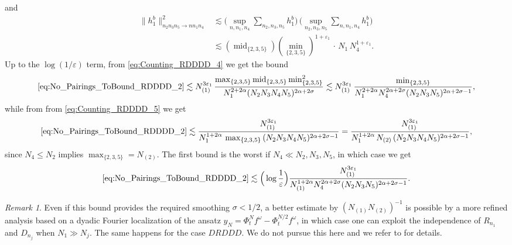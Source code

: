 \documentclass[11pt, xcolor = dvipsnames,reqno
]{amsart}
\theoremstyle{definition}
\theoremstyle{remark}
\newtheorem{rmk}[thm]{Remark}
\begin{document}
and 
\begin{align}\label{eq:Counting_RDDDD_5}
    \lVert  h^b_1 \rVert_{n_2n_3n_5 \to nn_1n_4}^2 
    &  \lesssim \Big(\sup_{n, n_1, n_4} \sum_{n_2, n_3, n_5} h^b_1  \Big)
    \, \Big( \sup_{n_2, n_3, n_5} \sum_{n, n_1, n_4} h^b _1\Big) \nonumber \\
    &\lesssim (\operatorname{mid}_{\{2,3,5\}})(\operatorname{min}_{\{2,3,5\}})^{1+{\varepsilon_1}}  \, \cdot \, N_1 \, N_4^{1+\varepsilon_1}.
\end{align}
Up to the $\log (1/\varepsilon)$ term, from \eqref{eq:Counting_RDDDD_4} we get the bound
\begin{align}
    \eqref{eq:No_Pairings_ToBound_RDDDD_2}
    \lesssim 
    N_{(1)}^{3\varepsilon_1} \,
    \frac{\operatorname{max}_{\{2,3,5\}} \operatorname{mid}_{\{2,3,5\}} \operatorname{min}_{\{2,3,5\}}^2 }{N_1^{2+2\alpha}(N_2N_3N_4N_5)^{2\alpha + 2\sigma}} 
    \lesssim 
    N_{(1)}^{3\varepsilon_1} \,
    \frac{\operatorname{min}_{\{2,3,5\}} 
    }{N_1^{2+2\alpha}N_4^{2\alpha + 2\sigma}(N_2N_3N_5)^{2 \alpha + 2\sigma - 1}}, 
\end{align}
while from from \eqref{eq:Counting_RDDDD_5} we get
\begin{align}
    \eqref{eq:No_Pairings_ToBound_RDDDD_2}
    \lesssim 
    \frac{N_{(1)}^{3\varepsilon_1}}{N_1^{1+2\alpha}  \, \operatorname{max}_{\{2,3,5\}} \, (N_2 N_3 N_4 N_5)^{2 \alpha + 2\sigma - 1} }
    = 
    \frac{N_{(1)}^{3\varepsilon_1}}{N_1^{1+2\alpha}  \, N_{(2)} \, (N_2 N_3 N_4 N_5)^{2 \alpha + 2\sigma - 1} },
\end{align}
since $N_4 \leq N_2$ implies $\operatorname{max}_{\{2,3,5\}} = N_{(2)}$.
The first bound is the worst if $N_4 \ll N_2, N_3, N_5$, in which case we get 
\begin{align}
    \eqref{eq:No_Pairings_ToBound_RDDDD_2}
    \lesssim 
    \Big( \log \frac{1}{\varepsilon} \Big) 
    \frac{ N_{(1)}^{3\varepsilon_1}}{N_{(1)}^{1+2\alpha}N_4^{2\alpha + 2\sigma}(N_2N_3N_5)^{2 \alpha + 2\sigma - 1}}.
\end{align}


\begin{rmk}\label{eq:rmk-haitian}
Even if this bound provides the required smoothing $\sigma < 1/2$, a better estimate by $(N_{(1)} N_{(2)})^{-1}$ is possible by a more refined analysis based on a dyadic Fourier localization of the ansatz $y_N = \Phi^N_t f^{\omega}- \Phi^{N/2}_t f^{\omega}$, in which case one can exploit the independence of $R_{n_1}$ and $D_{n_j}$ when $N_1 \gg N_j$. The same happens for the case $DRDDD$. We do not pursue this here and we refer to \cite{DNY2024} for details.
\end{rmk}
\end{document}
